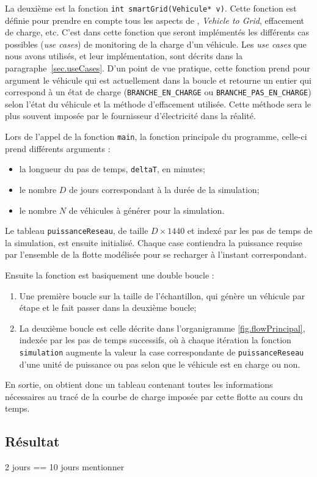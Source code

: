 			La deuxième est la fonction \lstinline{int smartGrid(Vehicule* v)}. Cette fonction est définie pour prendre en compte tous les aspects de \smartgrid{}, \emph{Vehicle to Grid}, effacement de charge, etc. C'est dans cette fonction que seront implémentés les différents cas possibles (\emph{use cases}) de monitoring de la charge d'un véhicule. Les \emph{use cases} que nous avons utilisés, et leur implémentation, sont décrits dans la paragraphe~\vref{sec.useCases}. 
			D'un point de vue pratique, cette fonction prend pour argument le véhicule qui est actuellement dans la boucle et retourne un entier qui correspond à un état de charge (\lstinline{BRANCHE_EN_CHARGE} ou \lstinline{BRANCHE_PAS_EN_CHARGE}) selon l'état du véhicule et la méthode d'effacement utilisée. Cette méthode sera le plus souvent imposée par le fournisseur d’électricité dans la réalité.
			
			\bigskip
			
			Lors de l'appel de la fonction \lstinline{main}, la fonction principale du programme, celle-ci prend différents arguments :
			\begin{itemize}
			\item la longueur du pas de temps, \lstinline{deltaT}, en minutes;
			\item le nombre $D$ de jours correspondant à la durée de la simulation;
			\item le nombre $N$ de véhicules à générer pour la simulation.
			\end{itemize}
			
			Le tableau \lstinline{puissanceReseau}, de taille $D \times 1440$ et indexé par les pas de temps de la simulation, est ensuite initialisé. Chaque case contiendra la puissance requise par l'ensemble de la flotte modélisée pour se recharger à l'instant correspondant.
			
			Ensuite la fonction est basiquement une double boucle :
			\begin{enumerate}
			\item Une première boucle sur la taille de l'échantillon, qui génère un véhicule par étape et le fait passer dans la deuxième boucle;
			\item La deuxième boucle est celle décrite dans l'organigramme \vref{fig.flowPrincipal}, indexée par les pas de temps successifs, où à chaque itération la fonction \lstinline{simulation} augmente la valeur la case correspondante de \lstinline{puissanceReseau} d'une unité de puissance ou pas selon que le véhicule est en charge ou non.
			\end{enumerate}
			
			En sortie, on obtient donc un tableau contenant toutes les informations nécessaires au tracé de la courbe de charge imposée par cette flotte au cours du temps.
		
		
		\clearpage
	\subsection{Résultat}

2 jours == 10 jours mentionner